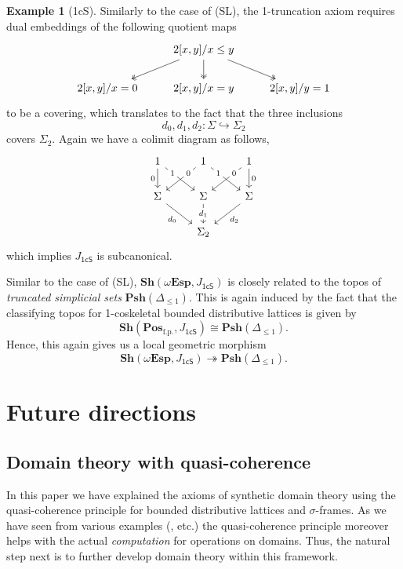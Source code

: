 \documentclass[12pt]{amsart}
\theoremstyle{definition}
\newtheorem{example}[theorem]{Example}
\newcommand{\mb}[1]{\mathbf{#1}}
\newcommand{\mr}[1]{\mathrm{#1}}
\newcommand{\ms}[1]{\mathsf{#1}}
\newcommand{\Pos}{\mb{Pos}}
\newcommand{\sh}{\mb{Sh}}
\newcommand{\psh}{\mb{Psh}}
\newcommand{\surj}{\twoheadrightarrow}
\newcommand{\hook}{\hookrightarrow}
\newcommand{\fp}{_{\mr{f.p.}}}
\newcommand{\wTop}{\omega\mb{Esp}}
\begin{document}
\begin{example}[1cS]\label{exm:model1T}
  Similarly to the case of (SL), the 1-truncation axiom requires dual embeddings of the following quotient maps
  \[\begin{tikzcd}
    & {2[x,y]/x\le y} \\
    {2[x,y]/x=0} & {2[x,y]/x=y} & {2[x,y]/y=1}
    \arrow[two heads, from=1-2, to=2-1]
    \arrow[two heads, from=1-2, to=2-2]
    \arrow[two heads, from=1-2, to=2-3]
  \end{tikzcd}\]
  to be a covering, which translates to the fact that the three inclusions
  \[ d_0,d_1,d_2 : \Sigma \hook \Sigma_2 \]
  covers $\Sigma_2$. Again we have a colimit diagram as follows, 
  \[\begin{tikzcd}
    1 & 1 & 1 \\
    \Sigma & \Sigma & \Sigma \\
    & {\Sigma_2}
    \arrow["0"', from=1-1, to=2-1]
    \arrow["1"{description, pos=0.25}, from=1-1, to=2-2]
    \arrow["0"{description, pos=0.25}, from=1-2, to=2-1]
    \arrow["1"{description, pos=0.25}, from=1-2, to=2-3]
    \arrow["0"{description, pos=0.25}, from=1-3, to=2-2]
    \arrow["0", from=1-3, to=2-3]
    \arrow["{d_0}"', from=2-1, to=3-2]
    \arrow["{d_1}"{description}, from=2-2, to=3-2]
    \arrow["{d_2}", from=2-3, to=3-2]
  \end{tikzcd}\]
  which implies $J_{\ms{1cS}}$ is subcanonical.
  
  Similar to the case of (SL), $\sh(\wTop,J_{\ms{1cS}})$ is closely related to the topos of \emph{truncated simplicial sets} $\psh(\Delta_{\le 1})$. This is again induced by the fact that the classifying topos for 1-coskeletal bounded distributive lattices is given by 
  \[ \sh(\Pos\fp,J_{\ms{1cS}}) \cong \psh(\Delta_{\le 1}). \]
  Hence, this again gives us a local geometric morphism
  \[ \sh(\wTop,J_{\ms{1cS}}) \surj \psh(\Delta_{\le 1}). \]
\end{example}


\section{Future directions}

\subsection{Domain theory with quasi-coherence}

In this paper we have explained the axioms of synthetic domain theory using the quasi-coherence principle for bounded distributive lattices and $\sigma$-frames. As we have seen from various examples (, etc.) the quasi-coherence principle moreover helps with the actual \emph{computation} for operations on domains. Thus, the natural step next is to further develop domain theory within this framework.
\end{document}
